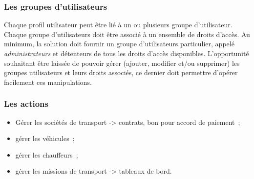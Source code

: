 \subsubsection{Les groupes d'utilisateurs}
Chaque profil utilisateur peut être lié à un ou plusieurs groupe d'utilisateur.
Chaque groupe d'utilisateurs doit être associé à un ensemble de droits d'accès.
Au minimum, la solution doit fournir un groupe d'utilisateurs particulier, appelé \emph{administrateurs} et détenteurs de tous les droits d'accès disponibles. L'opportunité souhaitant être laissée de pouvoir gérer (ajouter, modifier et/ou supprimer) les groupes utilisateurs et leurs droits associés, ce dernier doit permettre d'opérer facilement ces manipulations.

\subsubsection{Les actions}
\begin{itemize}
\item Gérer les sociétés de transport -> contrats, bon pour accord de paiement~;
\item gérer les véhicules~;
\item gérer les chauffeurs~;
\item gérer les missions de transport -> tableaux de bord.
\end{itemize}

